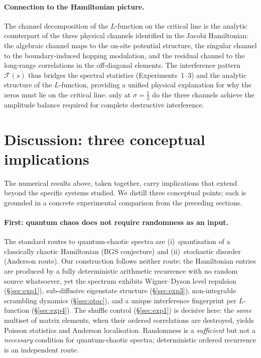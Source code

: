 \documentclass[aps,prx,reprint,floatfix]{revtex4-2}
\begin{document}
\paragraph{Connection to the Hamiltonian picture.}
The channel decomposition of the $L$-function on the critical line is the
analytic counterpart of the three physical channels identified in the
Jacobi Hamiltonian: the algebraic channel maps to the on-site potential
structure, the singular channel to the boundary-induced hopping modulation,
and the residual channel to the long-range correlations in the off-diagonal
elements.  The interference pattern $\mathcal{F}(s)$ thus bridges the
spectral statistics (Experiments~1--3) and the analytic structure of the
$L$-function, providing a unified physical explanation for why the zeros
must lie on the critical line: only at $\sigma=\tfrac{1}{2}$ do the three
channels achieve the amplitude balance required for complete destructive
interference.

\section{Discussion: three conceptual implications}
\label{sec:discussion}

The numerical results above, taken together, carry implications that extend
beyond the specific systems studied. We distill three conceptual points; each
is grounded in a concrete experimental comparison from the preceding sections.

\paragraph{First: quantum chaos does not require randomness as an input.}
The standard routes to quantum-chaotic spectra are (i)~quantisation of a
classically chaotic Hamiltonian (BGS conjecture) and (ii)~stochastic disorder
(Anderson route). Our construction follows neither route: the Hamiltonian
entries are produced by a fully deterministic arithmetic recurrence with no
random source whatsoever, yet the spectrum exhibits Wigner--Dyson level
repulsion (\S\ref{sec:exp1}), sub-diffusive eigenstate structure
(\S\ref{sec:exp3}), non-integrable scrambling dynamics (\S\ref{sec:otoc}),
and a unique interference fingerprint per $L$-function (\S\ref{sec:exp4}).
The shuffle control (\S\ref{sec:exp1}) is decisive here: the \emph{same}
multiset of matrix elements, when their ordered correlations are destroyed,
yields Poisson statistics and Anderson localisation. Randomness is a
\emph{sufficient} but not a \emph{necessary} condition for quantum-chaotic
spectra; deterministic ordered recurrence is an independent route.
\end{document}
